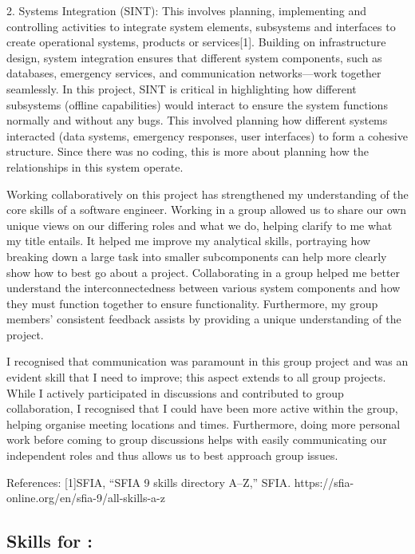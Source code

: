 \documentclass[a4paper, 11pt]{report}
\begin{document}
2. Systems Integration (SINT): This involves planning, implementing and controlling activities to integrate system elements, subsystems and interfaces to create operational systems, products or services[1]. Building on infrastructure design, system integration ensures that different system components, such as databases, emergency services, and communication networks—work together seamlessly. In this project, SINT is critical in highlighting how different subsystems (offline capabilities) would interact to ensure the system functions normally and without any bugs. This involved planning how different systems interacted (data systems, emergency responses, user interfaces) to form a cohesive structure. Since there was no coding, this is more about planning how the relationships in this system operate.

Working collaboratively on this project has strengthened my understanding of the core skills of a software engineer. Working in a group allowed us to share our own unique views on our differing roles and what we do, helping clarify to me what my title entails. It helped me improve my analytical skills, portraying how breaking down a large task into smaller subcomponents can help more clearly show how to best go about a project. Collaborating in a group helped me better understand the interconnectedness between various system components and how they must function together to ensure functionality. Furthermore, my group members' consistent feedback assists by providing a unique understanding of the project.

I recognised that communication was paramount in this group project and was an evident skill that I need to improve; this aspect extends to all group projects. While I actively participated in discussions and contributed to group collaboration, I recognised that I could have been more active within the group, helping organise meeting locations and times. Furthermore, doing more personal work before coming to group discussions helps with easily communicating our independent roles and thus allows us to best approach group issues.



References:
[1]SFIA, “SFIA 9 skills directory A–Z,” SFIA. https://sfia-online.org/en/sfia-9/all-skills-a-z

\subsection{Skills for \majD: \studD}
\end{document}
